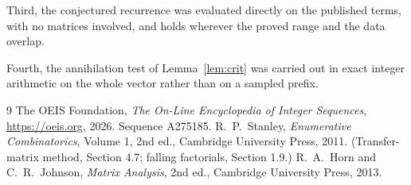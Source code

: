 \documentclass[11pt,a4paper]{article}
\theoremstyle{plain}
\theoremstyle{definition}
\begin{document}
Third, the conjectured recurrence was evaluated directly on the published terms, with no
matrices involved, and holds wherever the proved range and the data overlap.

Fourth, the annihilation test of Lemma~\ref{lem:crit} was carried out in exact integer
arithmetic on the whole vector rather than on a sampled prefix.

\begin{thebibliography}{9}
 The OEIS Foundation, \emph{The On-Line Encyclopedia of Integer
Sequences}, \url{https://oeis.org}, 2026. Sequence A275185.
 R.~P.~Stanley, \emph{Enumerative Combinatorics}, Volume 1, 2nd ed.,
Cambridge University Press, 2011. (Transfer-matrix method, Section 4.7; falling factorials,
Section 1.9.)
 R.~A.~Horn and C.~R.~Johnson, \emph{Matrix Analysis}, 2nd ed., Cambridge
University Press, 2013.
\end{thebibliography}
\end{document}
